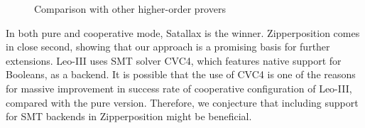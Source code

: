 \begin{figure}[t]
  \label{fig:higher-order-provers}
  \begin{center}
    \def\arraystretch{1.1}%
    \caption{Comparison with other higher-order provers}
  \end{center}
\end{figure}

In both pure and cooperative mode, Satallax is the winner.
Zipperposition comes in close second, showing that our approach is a promising
basis for further extensions. Leo-III uses SMT solver CVC4, which features
native support for Booleans, as a backend. It is possible that the use of CVC4 is
one of the reasons for massive improvement in success rate of cooperative
configuration of Leo-III, compared with the pure version. Therefore, we conjecture
that including support for SMT backends in Zipperposition might be beneficial.
